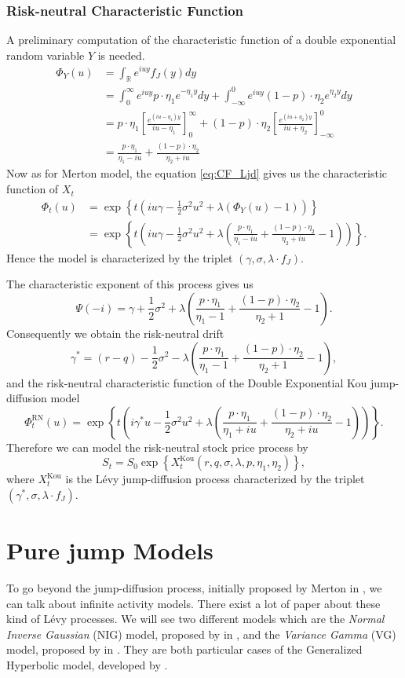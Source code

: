 \subsubsection*{Risk-neutral Characteristic Function}
A preliminary computation of the characteristic function of a double exponential random variable $Y$ is needed.
\begin{align*}
\Phi_Y(u)&=\int_\mathbb{R} e^{iuy}f_J(y) dy\\
&=\int_0^\infty e^{iuy}p\cdot \eta_1e^{-\eta_1 y}dy + \int_{-\infty}^0e^{iuy}(1-p)\cdot\eta_2e^{\eta_2 y}dy\\
&= p\cdot\eta_1\left[\frac{e^{(iu-\eta_1)y}}{iu-\eta_1}\right]_0^\infty+(1-p)\cdot\eta_2\left[\frac{e^{(iu+\eta_2)y}}{iu+\eta_2}\right]_{-\infty}^0\\
&=\frac{p\cdot\eta_1}{\eta_1-iu}+\frac{(1-p)\cdot\eta_2}{\eta_2+iu}
\end{align*}
Now as for Merton model, the equation \eqref{eq:CF_Ljd} gives us the characteristic function of $X_t$
\begin{align*}
\Phi_t(u)&=\exp\left\{t\left(iu\gamma-\frac{1}{2}\sigma^2 u^2 + \lambda\left(\Phi_Y(u)-1\right)\right)\right\}\\
&=\exp\left\{t\left(iu\gamma -\frac{1}{2}\sigma^2u^2 + \lambda\left(\frac{p\cdot\eta_1}{\eta_1-iu}+\frac{(1-p)\cdot\eta_2}{\eta_2+iu}-1\right)\right)\right\}.
\end{align*}
Hence the model is characterized by the triplet $(\gamma,\sigma,\lambda\cdot f_J)$.

The characteristic exponent of this process gives us
$$\Psi(-i) = \gamma + \frac{1}{2}\sigma^2 +\lambda \left(\frac{p\cdot\eta_1}{\eta_1-1}+\frac{(1-p)\cdot\eta_2}{\eta_2+1}-1\right).$$
Consequently we obtain the risk-neutral drift
$$\gamma^\ast = (r-q)- \frac{1}{2}\sigma^2 -\lambda \left(\frac{p\cdot\eta_1}{\eta_1-1}+\frac{(1-p)\cdot\eta_2}{\eta_2+1}-1\right),$$
and the risk-neutral characteristic function of the Double Exponential Kou jump-diffusion model
$$\Phi_t^\text{RN}(u)=\exp\left\{t\left(i\gamma^\ast u -\frac{1}{2}\sigma^2 u^2 +\lambda\left(\frac{p\cdot\eta_1}{\eta_1+iu}+\frac{(1-p)\cdot\eta_2}{\eta_2+iu}-1\right)\right)\right\}.$$
Therefore we can model the risk-neutral stock price process by
$$S_t=S_0\exp\left\{X_t^\text{Kou}(r,q,\sigma,\lambda,p,\eta_1,\eta_2)\right\},$$
where $X_t^\text{Kou}$ is the L\'evy jump-diffusion process characterized by the triplet $(\gamma^\ast,\sigma,\lambda\cdot f_J)$.

\section{Pure jump Models}
\label{sec:models:pure_jump}
To go beyond the jump-diffusion process, initially proposed by Merton in \citeyear{Mer76}, we can talk about infinite activity models. There exist a lot of paper about these kind of L\'evy processes. We will see two different models which are the \textit{Normal Inverse Gaussian} (NIG) model, proposed by \citeauthor{Bar97b} in \citeyear{Bar97b}, and the \textit{Variance Gamma} (VG) model, proposed by \citeauthor{MCC98} in \citeyear{MCC98}. They are both particular cases of the Generalized Hyperbolic model, developed by \citeauthor{EP98} \citeyearpar{EP98}.

